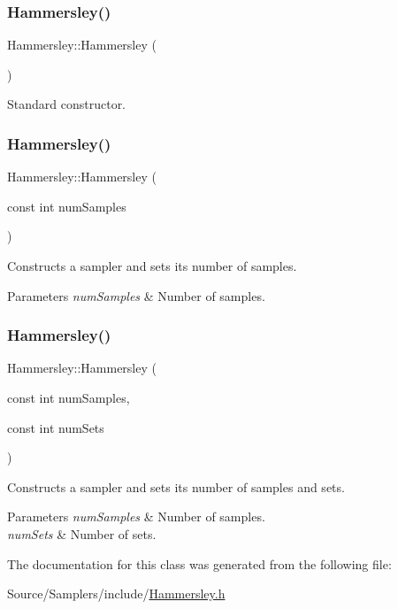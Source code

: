 \subsubsection{\texorpdfstring{Hammersley()}{Hammersley()}\hspace{0.1cm}{\footnotesize\ttfamily [1/3]}}
{\footnotesize\ttfamily Hammersley\+::\+Hammersley (\begin{DoxyParamCaption}{ }\end{DoxyParamCaption})}

Standard constructor. \hypertarget{class_hammersley_afeef5879129f035ef70c87cecce7aaa9}{}\label{class_hammersley_afeef5879129f035ef70c87cecce7aaa9} 
\subsubsection{\texorpdfstring{Hammersley()}{Hammersley()}\hspace{0.1cm}{\footnotesize\ttfamily [2/3]}}
{\footnotesize\ttfamily Hammersley\+::\+Hammersley (\begin{DoxyParamCaption}\item[{const int}]{num\+Samples }\end{DoxyParamCaption})}

Constructs a sampler and sets its number of samples. 
\begin{DoxyParams}{Parameters}
{\em num\+Samples} & Number of samples. \\
\hline
\end{DoxyParams}
\hypertarget{class_hammersley_a7e59d7d7df2709d1ccf3beedfb3da33b}{}\label{class_hammersley_a7e59d7d7df2709d1ccf3beedfb3da33b} 
\subsubsection{\texorpdfstring{Hammersley()}{Hammersley()}\hspace{0.1cm}{\footnotesize\ttfamily [3/3]}}
{\footnotesize\ttfamily Hammersley\+::\+Hammersley (\begin{DoxyParamCaption}\item[{const int}]{num\+Samples,  }\item[{const int}]{num\+Sets }\end{DoxyParamCaption})}

Constructs a sampler and sets its number of samples and sets. 
\begin{DoxyParams}{Parameters}
{\em num\+Samples} & Number of samples. \\
\hline
{\em num\+Sets} & Number of sets. \\
\hline
\end{DoxyParams}


The documentation for this class was generated from the following file\+:\begin{DoxyCompactItemize}
\item 
Source/\+Samplers/include/\hyperlink{_hammersley_8h}{Hammersley.\+h}\end{DoxyCompactItemize}
